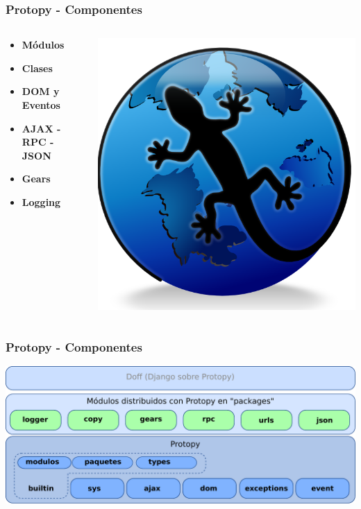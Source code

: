 \documentclass{beamer}
\begin{document}
\begin{frame}
    \frametitle{Protopy - Componentes}
        \begin{columns}[c]
         \begin{column}{5cm}
            \begin{itemize}
                \item {\bf Módulos}
                \item {\bf Clases}
                \item {\bf DOM y Eventos}
                \item {\bf AJAX - RPC - JSON}
                \item {\bf Gears}
                \item {\bf Logging}
             \end{itemize}
         \end{column}
         \begin{column}{5cm}
            \includegraphics[scale=0.5]{protopy.png}
         \end{column}
     \end{columns}                       
\end{frame}

\begin{frame}
    \frametitle{Protopy - Componentes}
    \includegraphics[scale=0.47]{esquema_protopy.pdf}
\end{frame}
\end{document}
